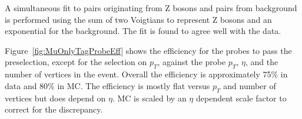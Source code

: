 A simultaneous fit to pairs originating from Z bosons and pairs from background is performed using the
sum of two Voigtians to represent Z bosons and an exponential for the background.
The fit is found to agree well with the data.



Figure~\ref{fig:MuOnlyTagProbeEff} shows the efficiency for the probes
to pass the preselection, except for the selection on $p_T$, against the probe
$p_T$, $\eta$, and the number of vertices in the event.
Overall the efficiency is approximately 75\% in data and 80\% in MC.
The efficiency is mostly flat versus $p_T$ and number of vertices but does depend
on $\eta$.  MC is scaled by an $\eta$ dependent scale factor to correct for the discrepancy.

